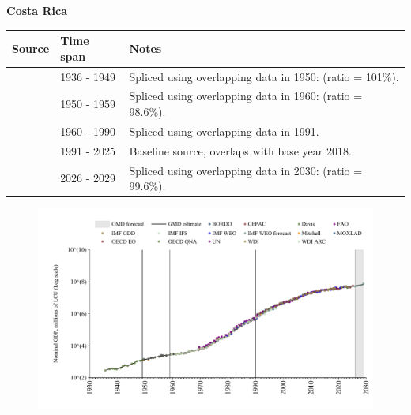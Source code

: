 \documentclass[12pt,a4paper,landscape]{article}
\begin{document}
\begin{adjustbox}{max totalsize={\paperwidth}{\paperheight},center}
\begin{minipage}[t][\textheight][t]{\textwidth}
\vspace*{0.5cm}
{}
\begin{center}
{\Large\bfseries Costa Rica}
\end{center}
\vspace{0.5cm}
\begin{table}[H]
\centering
\small
\begin{tabular}{|l|l|l|}
\hline
\textbf{Source} & \textbf{Time span} & \textbf{Notes} \\
\hline
\rowcolor{white}\cite{Davis}& 1936 - 1949 &Spliced using overlapping data in 1950: (ratio = 101\%).\\
\rowcolor{lightgray}\cite{IMF_GDD}& 1950 - 1959 &Spliced using overlapping data in 1960: (ratio = 98.6\%).\\
\rowcolor{white}\cite{WDI}& 1960 - 1990 &Spliced using overlapping data in 1991.\\
\rowcolor{lightgray}\cite{OECD_EO}& 1991 - 2025 &Baseline source, overlaps with base year 2018.\\
\rowcolor{white}\cite{IMF_WEO_forecast}& 2026 - 2029 &Spliced using overlapping data in 2030: (ratio = 99.6\%).\\
\hline
\end{tabular}
\end{table}
\begin{figure}[H]
\centering
\includegraphics[width=\textwidth,height=0.6\textheight,keepaspectratio]{graphs/CRI_nGDP.pdf}
\end{figure}
\end{minipage}
\end{adjustbox}
\end{document}
